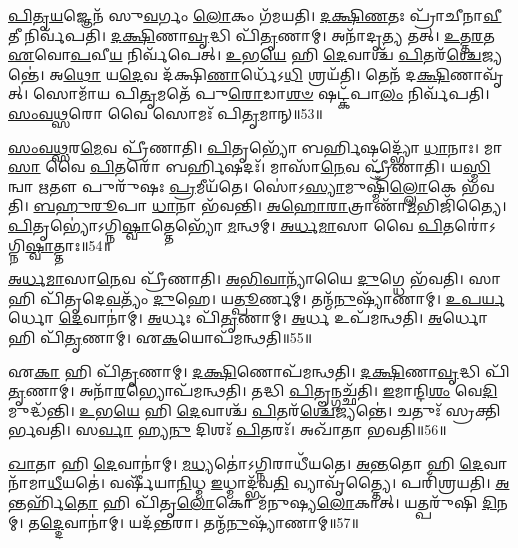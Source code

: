 \-\ul{𑌪𑌿}\-\-\ul{𑌤𑍃}\-\-\ul{𑌯}\-𑌜𑍍𑌞𑍇𑌨᳴ 𑌸𑍁\-\ul{𑌵}\-𑌰𑍍𑌗𑌂 \ul{𑌲𑍋}\-𑌕𑌂 𑌗᳴𑌮𑌯𑌤𑌿।
\-\ul{𑌦}\-\-\ul{𑌕𑍍𑌷𑌿}\-\-\ul{𑌣}\-𑌤𑌃 𑌪𑍍𑌰𑌾᳴𑌚𑍀𑌨𑌾\-\ul{𑌵𑍀}\-𑌤𑍀 𑌨𑌿𑌰𑍍𑌵᳴𑌪𑌤𑌿।
\-\ul{𑌦}\-\-\ul{𑌕𑍍𑌷𑌿}\-𑌣𑌾\-\ul{𑌵𑍃}\-𑌦𑍍𑌧𑌿 𑌪𑌿᳴\-\ul{𑌤𑍃}\-𑌣𑌾𑌮𑍍।
𑌅𑌨𑌾᳴𑌦𑍃\-\ul{𑌤𑍍𑌯} 𑌤𑌤𑍍।
\-\ul{𑌉}\-\-\ul{𑌤𑍍𑌤}\-\-\ul{𑌰}\-𑌤 \ul{𑌏}\-𑌵𑍋\-\ul{𑌪}\-𑌵𑍀\-\ul{𑌯} 𑌨𑌿𑌰𑍍𑌵᳴𑌪𑍇𑌤𑍍।
\-\ul{𑌉}\-𑌭\-\ul{𑌯𑍇} 𑌹𑌿 \ul{𑌦𑍇}\-𑌵𑌾𑌶𑍍𑌚᳴ \ul{𑌪𑌿}\-𑌤𑌰᳴\-\ul{𑌶𑍍𑌚𑍇}\-𑌜𑍍𑌯𑌨𑍍𑌤𑍇॑।
𑌅\-\ul{𑌥𑍋} 𑌯\-\ul{𑌦𑍇}\-𑌵 𑌦᳴𑌕𑍍𑌷𑌿\-\ul{𑌣𑌾}\-𑌰𑍍𑌧𑍇᳴𑌽\-\ul{𑌧𑌿} 𑌶𑍍𑌰𑌯᳴𑌤𑌿।
𑌤𑍇𑌨᳴ 𑌦\-\ul{𑌕𑍍𑌷𑌿}\-𑌣𑌾𑌵𑍃᳴𑌤𑍍।
𑌸𑍋𑌮𑌾᳴𑌯 𑌪𑌿\-\ul{𑌤𑍃}\-𑌮𑌤𑍇᳴ 𑌪𑍁\-\ul{𑌰𑍋}\-𑌡𑌾\-\ul{𑌶}\-\-\ul{𑍞} 𑌷𑌟𑍍𑌕᳴𑌪𑌾\-\ul{𑌲𑌂} 𑌨𑌿𑌰𑍍𑌵᳴𑌪𑌤𑌿।
\-\ul{𑌸𑌂}\-\-\ul{𑌵}\-\-\ul{𑌥𑍍𑌸}\-𑌰𑍋 𑌵𑍈 𑌸𑍋𑌮𑌃᳴ 𑌪𑌿\-\ul{𑌤𑍃}\-𑌮𑌾𑌨𑍍॥53॥

\-\ul{𑌸𑌂}\-\-\ul{𑌵}\-\-\ul{𑌥𑍍𑌸}\-𑌰\-\ul{𑌮𑍇}\-𑌵 𑌪𑍍𑌰𑍀᳴𑌣𑌾𑌤𑌿।
\-\ul{𑌪𑌿}\-𑌤𑍃𑌭𑍍𑌯𑍋᳴ 𑌬𑌰𑍍\mbox{}\-\ul{𑌹𑌿}\-𑌷𑌦𑍍𑌭𑍍𑌯𑍋᳴ \ul{𑌧𑌾}\-𑌨𑌾𑌃।
𑌮𑌾\-\ul{𑌸𑌾} 𑌵𑍈 \ul{𑌪𑌿}\-𑌤𑌰𑍋᳴ 𑌬𑌰𑍍\mbox{}\-\ul{𑌹𑌿}\-𑌷𑌦𑌃᳴।
𑌮𑌾𑌸𑌾᳴\-\ul{𑌨𑍇}\-𑌵 𑌪𑍍𑌰𑍀᳴𑌣𑌾𑌤𑌿।
𑌯\-\ul{𑌸𑍍𑌮𑌿}\-𑌨𑍍𑌵𑌾 \ul{𑌋}\-𑌤𑍗 𑌪𑍁𑌰𑍁᳴𑌷𑌃 \ul{𑌪𑍍𑌰}\-𑌮𑍀𑌯᳴𑌤𑍇।
𑌸𑍋॑𑌽\-\ul{𑌸𑍍𑌯𑌾}\-𑌮𑍁𑌷𑍍𑌮𑌿𑌁᳴\-\ul{𑌲𑍍𑌲𑍋}\-𑌕𑍇 𑌭᳴𑌵𑌤𑌿।
\-\ul{𑌬}\-\-\ul{𑌹𑍁}\-\-\ul{𑌰𑍂}\-𑌪𑌾 \ul{𑌧𑌾}\-𑌨𑌾 𑌭᳴𑌵𑌨𑍍𑌤𑌿।
\-\ul{𑌅}\-\-\ul{𑌹𑍋}\-\-\ul{𑌰𑌾}\-𑌤𑍍𑌰𑌾𑌣𑌾᳴\-\ul{𑌮}\-𑌭𑌿𑌜𑌿᳴𑌤𑍍𑌯𑍈।
\-\ul{𑌪𑌿}\-𑌤𑍃𑌭𑍍𑌯𑍋॑\-𑌽𑌗𑍍𑌨𑌿\-\ul{𑌷𑍍𑌵𑌾}\-𑌤𑍍𑌤𑍇𑌭𑍍𑌯𑍋᳴ \ul{𑌮}\-𑌨𑍍𑌥𑌮𑍍।
\-\ul{𑌅}\-\-\ul{𑌰𑍍𑌧}\-\-\ul{𑌮𑌾}\-𑌸𑌾 𑌵𑍈 \ul{𑌪𑌿}\-𑌤𑌰𑍋॑\-𑌽𑌗𑍍𑌨𑌿\-\ul{𑌷𑍍𑌵𑌾}\-𑌤𑍍𑌤𑌾𑌃॥54॥

\-\ul{𑌅}\-\-\ul{𑌰𑍍𑌧}\-\-\ul{𑌮𑌾}\-𑌸𑌾\-\ul{𑌨𑍇}\-𑌵 𑌪𑍍𑌰𑍀᳴𑌣𑌾𑌤𑌿।
\-\ul{𑌅}\-\-\ul{𑌭𑌿}\-\-\ul{𑌵𑌾}\-𑌨𑍍𑌯𑌾᳴𑌯𑍈 \ul{𑌦𑍁}\-𑌗𑍍𑌧𑍇 𑌭᳴𑌵𑌤𑌿।
𑌸𑌾 𑌹𑌿 𑌪𑌿᳴𑌤𑍃𑌦𑍇\-\ul{𑌵}\-𑌤𑍍𑌯𑌂᳴ \ul{𑌦𑍁}\-𑌹𑍇।
𑌯\-\ul{𑌤𑍍𑌪𑍂}\-𑌰𑍍𑌣𑌮𑍍।
𑌤𑌨𑍍𑌮᳴\-\ul{𑌨𑍁}\-𑌷𑍍𑌯𑌾᳴𑌣𑌾𑌮𑍍।
\-\ul{𑌉}\-\-\ul{𑌪}\-\-\ul{𑌰𑍍𑌯}\-𑌰𑍍𑌧𑍋 \ul{𑌦𑍇}\-𑌵𑌾𑌨𑌾॑𑌮𑍍।
\-\ul{𑌅}\-𑌰𑍍𑌧𑌃 𑌪𑌿᳴\-\ul{𑌤𑍃}\-𑌣𑌾𑌮𑍍।
\-\ul{𑌅}\-𑌰𑍍𑌧 𑌉𑌪᳴𑌮𑌨𑍍𑌥𑌤𑌿।
\-\ul{𑌅}\-𑌰𑍍𑌧𑍋 𑌹𑌿 𑌪𑌿᳴\-\ul{𑌤𑍃}\-𑌣𑌾𑌮𑍍।
𑌏\-\ul{𑌕}\-𑌯𑍋𑌪᳴𑌮𑌨𑍍𑌥𑌤𑌿॥55॥

𑌏\-\ul{𑌕𑌾} 𑌹𑌿 𑌪𑌿᳴\-\ul{𑌤𑍃}\-𑌣𑌾𑌮𑍍।
\-\ul{𑌦}\-\-\ul{𑌕𑍍𑌷𑌿}\-𑌣𑍋𑌪᳴𑌮𑌨𑍍𑌥𑌤𑌿।
\-\ul{𑌦}\-\-\ul{𑌕𑍍𑌷𑌿}\-𑌣𑌾\-\ul{𑌵𑍃}\-𑌦𑍍𑌧𑌿 𑌪𑌿᳴\-\ul{𑌤𑍃}\-𑌣𑌾𑌮𑍍।
𑌅𑌨𑌾᳴\-\ul{𑌰}\-𑌭𑍍𑌯𑍋𑌪᳴𑌮𑌨𑍍𑌥𑌤𑌿।
𑌤𑌦𑍍𑌧𑌿 \ul{𑌪𑌿}\-𑌤𑍄𑌨𑍍𑌗𑌚𑍍𑌛᳴𑌤𑌿।
\-\ul{𑌇}\-𑌮𑌾𑌨𑍍𑌦𑌿\-\ul{𑌶𑌂} 𑌵𑍇\-\ul{𑌦𑌿}\-𑌮𑍁𑌦𑍍𑌧᳴𑌨𑍍𑌤𑌿।
\-\ul{𑌉}\-𑌭\-\ul{𑌯𑍇} 𑌹𑌿 \ul{𑌦𑍇}\-𑌵𑌾𑌶𑍍𑌚᳴ \ul{𑌪𑌿}\-𑌤𑌰᳴\-\ul{𑌶𑍍𑌚𑍇}\-𑌜𑍍𑌯𑌨𑍍𑌤𑍇॑।
𑌚𑌤𑍁𑌃᳴ 𑌸𑍍𑌰𑌕𑍍𑌤𑌿𑌰𑍍𑌭𑌵𑌤𑌿।
𑌸\-\ul{𑌰𑍍𑌵𑌾} 𑌹𑍍𑌯\-\ul{𑌨𑍁} 𑌦𑌿𑌶𑌃᳴ \ul{𑌪𑌿}\-𑌤𑌰𑌃᳴।
𑌅𑌖𑌾᳴𑌤𑌾 𑌭𑌵𑌤𑌿॥56॥

\-\ul{𑌖𑌾}\-𑌤𑌾 𑌹𑌿 \ul{𑌦𑍇}\-𑌵𑌾𑌨𑌾॑𑌮𑍍।
\-\ul{𑌮}\-\-\ul{𑌧𑍍𑌯}\-𑌤𑍋॑\-𑌽𑌗𑍍𑌨𑌿𑌰𑌾𑌧𑍀᳴𑌯𑌤𑍇।
\-\ul{𑌅}\-\-\ul{𑌨𑍍𑌤}\-𑌤𑍋 𑌹𑌿 \ul{𑌦𑍇}\-𑌵𑌾𑌨𑌾᳴𑌮𑌾\-\ul{𑌧𑍀}\-𑌯𑌤𑍇॑।
𑌵𑌰𑍍\mbox{}𑌷𑍀᳴𑌯𑌾\-\ul{𑌨𑌿}\-𑌧𑍍𑌮 \ul{𑌇}\-𑌧𑍍𑌮𑌾𑌦𑍍𑌭᳴𑌵\-\ul{𑌤𑌿} 𑌵𑍍𑌯𑌾𑌵𑍃᳴𑌤𑍍𑌤𑍍𑌯𑍈।
𑌪𑌰𑌿᳴𑌶𑍍𑌰𑌯𑌤𑌿।
\-\ul{𑌅}\-𑌨𑍍𑌤𑌰𑍍\mbox{}𑌹𑌿᳴\-\ul{𑌤𑍋} 𑌹𑌿 𑌪𑌿᳴𑌤𑍃\-\ul{𑌲𑍋}\-𑌕𑍋 𑌮᳴𑌨𑍁𑌷𑍍𑌯\-\ul{𑌲𑍋}\-𑌕𑌾𑌤𑍍।
𑌯𑌤𑍍𑌪𑌰𑍁᳴𑌷𑌿 \ul{𑌦𑌿}\-𑌨𑌮𑍍।
𑌤\-\ul{𑌦𑍍𑌦𑍇}\-𑌵𑌾𑌨𑌾॑𑌮𑍍।
𑌯𑌦᳴\-\ul{𑌨𑍍𑌤}\-𑌰𑌾।
𑌤𑌨𑍍𑌮᳴\-\ul{𑌨𑍁}\-𑌷𑍍𑌯𑌾᳴𑌣𑌾𑌮𑍍॥57॥

